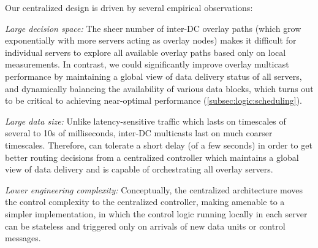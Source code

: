 Our centralized design is driven by several empirical observations:
\begin{packedenumerate}

\item {\em Large decision space:}
The sheer number of inter-DC overlay paths (which grow exponentially
with more servers acting as overlay nodes) makes it difficult for
individual servers to explore all available overlay paths based only
on local measurements. In contrast, we could significantly improve
overlay multicast performance by maintaining a global view of data
delivery status of all servers, and dynamically balancing the
availability of various data blocks, which turns out to be critical
to achieving near-optimal performance
(\Section\ref{subsec:logic:scheduling}).

\item {\em Large data size:}
Unlike latency-sensitive traffic which lasts
on timescales of several to 10s of milliseconds, inter-DC multicasts
last on much coarser timescales.
Therefore, \name can tolerate a short delay (of a few seconds) in order
to get better routing decisions from a centralized controller which
maintains a global view of data delivery and is capable of orchestrating
all overlay servers.


\item {\em Lower engineering complexity:}
Conceptually, the centralized architecture moves the control
complexity to the centralized controller, making \name amenable to a
simpler implementation, in which the control logic running locally in
each server can be stateless and triggered only on arrivals of new
data units or control messages.

\end{packedenumerate}

